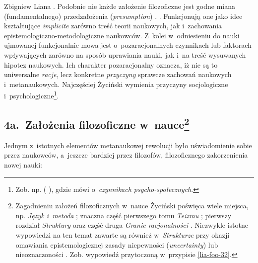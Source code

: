 \begin{artplenv}{Zbigniew Liana}
{\parencites[s.~29]{zycinski_structure_1988}[s.~51]{zycinski_struktura_2013}.
Podobnie nie każde założenie filozoficzne jest godne miana (fundamentalnego) przedzałożenia
(\textit{presumption})
\parencites[s.~143]{zycinski_structure_1988}[s.~253]{zycinski_struktura_2013}.
}. Funkcjonują one jako idee
kształtujące \textit{implicite} zarówno treść teorii naukowych, jak i~zachowania epistemologiczno-metodologiczne
naukowców. Z~kolei w~odniesieniu do nauki ujmowanej funkcjonalnie mowa jest o~pozaracjonalnych czynnikach lub faktorach
wpływających zarówno na sposób uprawiania nauki, jak i~na treść wysuwanych hipotez naukowych. Ich charakter
pozaracjonalny oznacza, iż nie są to uniwersalne\textit{ racje}, lecz konkretne \textit{przyczyny} sprawcze zachowań
naukowych i~metanaukowych. Najczęściej Życiński wymienia przyczyny socjologiczne i~psychologiczne\footnote{Zob. np. 
(\cites[s.~142nn]{zycinski_jezyk_1983}[s.~9]{zycinski_structure_1988}[s.~17,]{zycinski_struktura_2013}
\cite*[a~także][s.~190]{zycinski_elementy_1996}),
gdzie
mówi o~\textit{czynnikach psycho-społecznych}.}.

\subsection{4a.~Założenia filozoficzne w~nauce\footnote{Zagadnieniu założeń filozoficznych w~nauce Życiński poświęca wiele miejsca,
np. \textit{Język i~metoda}
\parencite*[s.~246–261]{zycinski_jezyk_1983};
znaczna część pierwszego tomu
\textit{Teizmu} \parencite[s.~156–232]{zycinski_teizm_1985};
pierwszy rozdział \textit{Struktury} oraz część druga
\textit{Granic racjonalności} \parencite{zycinski_granice_1993}.
Niezwykle istotne wypowiedzi na ten temat zawarte są również
w~\textit{Strukturze} przy okazji omawiania epistemologicznej zasady niepewności (\textit{uncertainty}) lub nieoznaczoności
\parencites[s.~143n]{zycinski_structure_1988}[s.~254–256]{zycinski_struktura_2013}.
Zob. wypowiedź przytoczoną w~przypisie \ref{lia-foo-32}.}}

Jednym z~istotnych elementów metanaukowej rewolucji było uświadomienie sobie przez naukowców, a~jeszcze bardziej przez
filozofów, filozoficznego zakorzenienia nowej nauki:


\end{artplenv}
